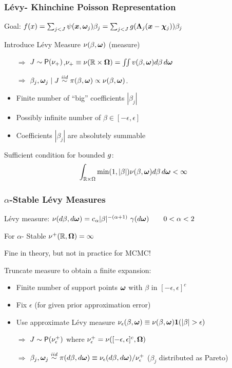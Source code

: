 \documentclass[]{beamer}
\newcommand{\bs}[2]{\begin{frame} \frametitle{#1}
{#2}
\end{frame} }
\begin{document}
\bs{L\'evy- Khinchine  Poisson Representation}{
Goal: $f(x) = \sum_{j < J}  \psi(\bm x, \bm \omega_j) \beta_j = \sum_{j <
  J} g(\bm \Lambda_j(\bm x - \bm \chi_j)) \beta_j$
\pause

Introduce  L\'evy Measure $\nu(\beta, \bm \omega)$ (measure)
\pause

\begin{itemize}
\item[$\Rightarrow$] $J \sim \mbox{\sf P}(\nu_+)$,\qquad $\nu_+\equiv
  \nu(\mathbb{R}\times\bm \Omega) = \iint v(\beta, \bm \omega) d \beta \,
  d\bm \omega$  \pause
\item[$\Rightarrow$] $\beta_j,\bm \omega_j \mid J \mathrel{\mathop{\sim}\limits^{\mathit{iid}}} \pi(\beta, \bm \omega)
  \propto \nu(\beta,\bm \omega)$. \pause
\end{itemize}

\begin{itemize}
  \item Finite number of ``big'' coefficients $|\beta_j|$ \pause
  \item Possibly infinite number of $\beta \in [-\epsilon, \epsilon]$ \pause
  \item Coefficients $|\beta_j|$ are absolutely summable \pause
 \end{itemize}

{Sufficient condition} for bounded $g$:
\begin{equation}
  \label{eq:l1-bound}
\int_{\mathbb{R} \times \Omega} \min(1, |\beta|) \nu(\beta,
  \bm \omega)d \beta \,
  d\bm \omega  < \infty
\end{equation}


}


\bs{$\alpha$-Stable L\'evy Measures} {

L\'evy measure: $\nu(d\beta, d\bm \omega) =  c_\alpha |\beta|^{-(\alpha
    +1)}\ \gamma(d\bm \omega) \qquad 0 < \alpha < 2$ \pause

For $\alpha$- Stable $\nu^+(\mathbb{R}, \bm \Omega) = \infty$ \pause

Fine in theory, but not in practice for MCMC! \pause

\vspace{14pt}
Truncate measure to obtain a finite expansion:
\begin{itemize}
 \item Finite number of support points $\bm \omega$ with $\beta$ in
   $[-\epsilon, \epsilon]^c$  \pause
\item Fix $\epsilon$  (for given prior approximation error) \pause
\item Use approximate L\'evy  measure
$\nu_{\epsilon}(\beta, \bm \omega) \equiv \nu(\beta,
\bm \omega){\bm 1}(|\beta| > \epsilon) $ \pause
\item[$\Rightarrow$] $J \sim \mbox{\sf P}(\nu_{\epsilon}^+)$ where
  $\nu^+_{\epsilon} = \nu([-\epsilon, \epsilon]^c, \bm \Omega)$ \pause
\item[$\Rightarrow$]  $\beta_j, \bm \omega_j \mathrel{\mathop{\sim}\limits^{\mathit{iid}}} \pi(d\beta, d\bm \omega) \equiv
  \nu_\epsilon(d\beta , d \bm \omega)/\nu^+_{\epsilon}$ ($\beta_j$
  distributed as Pareto)

\end{itemize}
}
\end{document}
